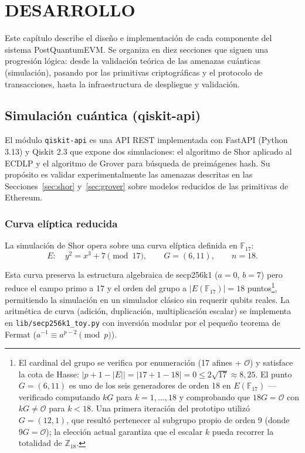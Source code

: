 \chapter{DESARROLLO}
\label{cap:desarrollo}

Este capítulo describe el diseño e implementación de cada componente del sistema PostQuantumEVM. Se organiza en diez secciones que siguen una progresión lógica: desde la validación teórica de las amenazas cuánticas (simulación), pasando por las primitivas criptográficas y el protocolo de transacciones, hasta la infraestructura de despliegue y validación.


\section{Simulación cuántica (qiskit-api)}
\label{sec:dev_qiskit}

El módulo \texttt{qiskit-api} es una API REST implementada con FastAPI (Python 3.13) y Qiskit 2.3 que expone dos simulaciones: el algoritmo de Shor aplicado al ECDLP y el algoritmo de Grover para búsqueda de preimágenes hash. Su propósito es validar experimentalmente las amenazas descritas en las Secciones~\ref{sec:shor} y~\ref{sec:grover} sobre modelos reducidos de las primitivas de Ethereum.

\subsection{Curva elíptica reducida}

La simulación de Shor opera sobre una curva elíptica definida en $\mathbb{F}_{17}$:
\begin{equation}
  E: \quad y^2 = x^3 + 7 \pmod{17}, \qquad G = (6, 11), \qquad n = 18.
  \label{eq:toy_curve}
\end{equation}

Esta curva preserva la estructura algebraica de secp256k1 ($a = 0$, $b = 7$) pero reduce el campo primo a 17 y el orden del grupo a $|E(\mathbb{F}_{17})| = 18$ puntos\footnote{El cardinal del grupo se verifica por enumeración (17 afines + $\mathcal{O}$) y satisface la cota de Hasse: $|p+1 - |E|| = |17+1-18| = 0 \leq 2\sqrt{17} \approx 8{,}25$. El punto $G = (6,11)$ es uno de los seis generadores de orden 18 en $E(\mathbb{F}_{17})$ ---verificado computando $kG$ para $k=1,\ldots,18$ y comprobando que $18G = \mathcal{O}$ con $kG \neq \mathcal{O}$ para $k < 18$. Una primera iteración del prototipo utilizó $G=(12,1)$, que resultó pertenecer al subgrupo propio de orden 9 (donde $9G = \mathcal{O}$); la elección actual garantiza que el escalar $k$ pueda recorrer la totalidad de $\mathbb{Z}_{18}$.}, permitiendo la simulación en un simulador clásico sin requerir qubits reales. La aritmética de curva (adición, duplicación, multiplicación escalar) se implementa en \texttt{lib/secp256k1\_toy.py} con inversión modular por el pequeño teorema de Fermat ($a^{-1} \equiv a^{p-2} \pmod{p}$).

